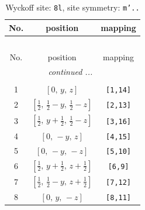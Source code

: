 \documentclass[fleqn,8pt]{jsarticle}
\begin{document}
\begin{longtable}{ccc}
\caption{Wyckoff site: {\tt 8l}, site symmetry: {\tt m'..}}
 \\
 \hline \hline
No. & position & mapping \\ \hline \endfirsthead

\multicolumn{2}{l}{\tablename\ \thetable{}} \\
 \hline \hline
No. & position & mapping \\ \hline \endhead

 \hline \hline
\multicolumn{2}{r}{\footnotesize\it continued ...} \\ \endfoot

 \hline \hline
\multicolumn{2}{r}{} \\ \endlastfoot

1 & $\left[ 0,\, y,\, z \right]$ & {\tt [1,14]} \\ \hline
2 & $\left[ \frac{1}{2},\, \frac{1}{2} - y,\, \frac{1}{2} - z \right]$ & {\tt [2,13]} \\ \hline
3 & $\left[ \frac{1}{2},\, y + \frac{1}{2},\, \frac{1}{2} - z \right]$ & {\tt [3,16]} \\ \hline
4 & $\left[ 0,\, - y,\, z \right]$ & {\tt [4,15]} \\ \hline
5 & $\left[ 0,\, - y,\, - z \right]$ & {\tt [5,10]} \\ \hline
6 & $\left[ \frac{1}{2},\, y + \frac{1}{2},\, z + \frac{1}{2} \right]$ & {\tt [6,9]} \\ \hline
7 & $\left[ \frac{1}{2},\, \frac{1}{2} - y,\, z + \frac{1}{2} \right]$ & {\tt [7,12]} \\ \hline
8 & $\left[ 0,\, y,\, - z \right]$ & {\tt [8,11]} \\
\end{longtable}
\renewcommand{\arraystretch}{1.2}
\end{document}
